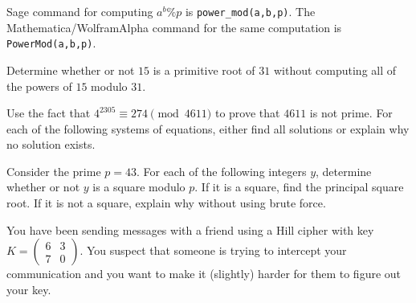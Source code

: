 \documentclass[11pt,addpoints,letterpaper]{exam}
\begin{document}
Sage command for computing $a^b\%p$ is \verb|power_mod(a,b,p)|. The Mathematica/WolframAlpha command for the same computation is \verb|PowerMod(a,b,p)|. 
\vfill





\newpage

\begin{questions}
\question[3] Determine whether or not $15$ is a primitive root of $31$ without computing all of the powers of $15$ modulo $31$.
\vfill

\question[4]Use the fact that $4^{2305}\equiv274\pmod{4611}$ to prove that $4611$ is not prime. 
\vfill 
 \newpage
 \question For each of the following systems of equations, either find all solutions or explain why no solution exists. 
 \vfill

\vfill
    \newpage


\question Consider the prime $p=43$. For each of the following integers $y$, determine whether or not $y$ is a square modulo $p$. If it is a square, find the principal square root. If it is not a square, explain why without using brute force. 
          
          \bigskip
   
  
   \newpage
    \question You have been sending messages with a friend using a Hill cipher with key $K=\begin{pmatrix}
6 & 3 \\7 &0
\end{pmatrix}.$ You suspect that someone is trying to intercept your communication and you want to make it (slightly) harder for them to figure out your key.  


\end{questions}
\end{document}

